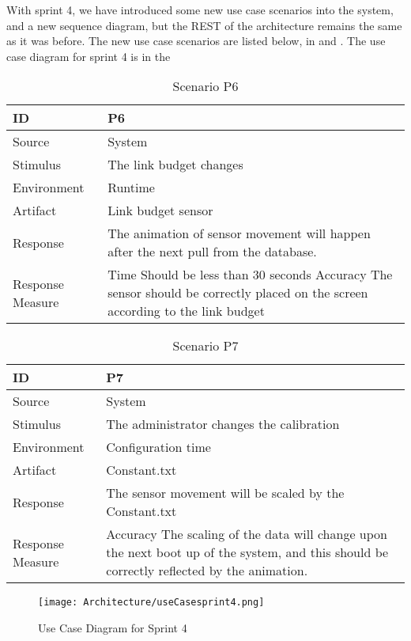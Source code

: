 \documentclass[../document.tex]{subfiles}
\begin{document}
With sprint 4, we have introduced some new use case scenarios into the system, and a new sequence diagram, but the \gls{REST} of the architecture remains the same as it was before. The new use case scenarios are listed below, in  and . The use case diagram for sprint 4 is in the 
\begin{table}[H]
\caption{Scenario P6}
\label{scenario6}
\begin{tabularx}{\textwidth}{|X|X|}
\hline	
ID
&P6
\\ \hline Source
&System
\\ \hline Stimulus
&The link budget changes
\\ \hline Environment
&Runtime
\\ \hline Artifact
&Link budget sensor
\\ \hline Response
&The animation of sensor movement will happen after the next pull from the database.
\\ \hline Response Measure
&Time \newline
Should be less than 30 seconds \newline
Accuracy \newline
The sensor should be correctly placed on the screen according to the link budget
\\ \hline
\end{tabularx}
\end{table}

\begin{table}[H]
\caption{Scenario P7}
\label{scenario7}
\begin{tabularx}{\textwidth}{|X|X|}
\hline	
ID
&P7
\\ \hline Source
&System
\\ \hline Stimulus
&The administrator changes the calibration
\\ \hline Environment
&Configuration time
\\ \hline Artifact
&Constant.txt
\\ \hline Response
&The sensor movement will be scaled by the Constant.txt
\\ \hline Response Measure
&Accuracy \newline
The scaling of the data will change upon the next boot up of the system, and this should be correctly reflected by the animation.
\\ \hline
\end{tabularx}
\end{table}

\begin{figure}[H]
	\centering
	\texttt{[image: Architecture/useCasesprint4.png]}
	\caption{Use Case Diagram for Sprint 4}
	\label{usecasesprint4}
\end{figure}
\end{document}
